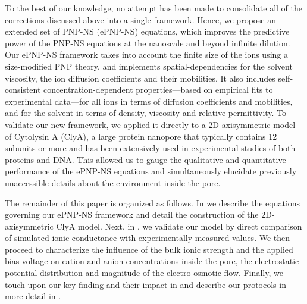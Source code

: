 \documentclass[journal=ancac3,manuscript=article,etalmode=truncate,maxauthors=0,layout=onecolumn]{achemso}
\begin{document}
To the best of our knowledge, no attempt has been made to consolidate all of the corrections discussed above
into a single framework. Hence, we propose an extended set of PNP-NS (ePNP-NS) equations, which improves the
predictive power of the PNP-NS equations at the nanoscale and beyond infinite dilution. Our ePNP-NS framework
takes into account the finite size of the ions using a size-modified PNP theory,\cite{Lu-2011} and implements
spatial-dependencies for the solvent viscosity,\cite{Pronk-2014,Hsu-2017} the ion diffusion coefficients and
their mobilities.\cite{Makarov-1998,Noskov-2004} It also includes self-consistent concentration-dependent
properties---based on empirical fits to experimental data---for all ions in terms of diffusion
coefficients and mobilities,\cite{Baldessari-2008-1,Mills-1989} and for the solvent in terms of density,
viscosity\cite{Hai-Lang-1996} and relative permittivity\cite{Gavish-2016}. To validate our new framework, we
applied it directly to a 2D-axisymmetric model of Cytolysin A (ClyA), a large protein nanopore that typically
contains 12 subunits\cite{Mueller-2009} or more\cite{Soskine-2013} and has been extensively used in
experimental studies of both proteins\cite{Soskine-2013,VanMeervelt-2014,Soskine-Biesemans-2015,
Biesemans-Soskine-2015,Wloka-2017,VanMeervelt-2017,Galenkamp-2018,Willems-Ruic-Biesemans-2019} and
DNA.\cite{Franceschini-2013,Franceschini-2016,Nomidis-2018} This allowed us to gauge the qualitative and
quantitative performance of the ePNP-NS equations and simultaneously elucidate previously unaccessible details
about the environment inside the pore.

The remainder of this paper is organized as follows. In \emph{} we describe the equations
governing our ePNP-NS framework and detail the construction of the 2D-axisymmetric ClyA model. Next, in
\emph{}, we validate our model by direct comparison of simulated ionic conductance with
experimentally measured values. We then proceed to characterize the influence of the bulk ionic strength and
the applied bias voltage on cation and anion concentrations inside the pore, the electrostatic potential
distribution and magnitude of the electro-osmotic flow. Finally, we touch upon our key finding and their
impact in \emph{} and describe our protocols in more detail in
\emph{}.
\end{document}
